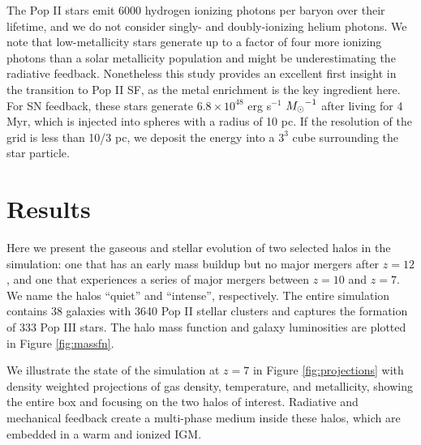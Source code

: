\documentclass[apjl]{emulateapj}
\newcommand{\Ms}{\ifmmode{M_\odot}\else{$M_\odot$}\fi}
\begin{document}
The Pop II stars emit 6000 hydrogen ionizing photons per baryon over
their lifetime, and we do not consider singly- and doubly-ionizing
helium photons.  We note that low-metallicity stars generate up to a
factor of four more ionizing photons than a solar metallicity
population \citep{Schaerer03} and might be underestimating the
radiative feedback.  Nonetheless this study provides an excellent
first insight in the transition to Pop II SF, as the metal enrichment
is the key ingredient here.  For SN feedback, these stars generate
$6.8 \times 10^{48}$ erg s$^{-1}$ $\Ms^{-1}$ after living for 4 Myr,
which is injected into spheres with a radius of 10 pc.  If the
resolution of the grid is less than 10/3 pc, we deposit the energy
into a $3^3$ cube surrounding the star particle.

\begin{figure*}
\caption{\label{fig:evo} (a) Evolution of the total halo mass (top),
  stellar mass (middle), and gas fraction (bottom) of the quiet
  (dashed) and intense (solid) halos.  (b) Mass-weighted stellar
  metallicities and gas metallicities enriched by Pop II and Pop III
  SNe of the intense (top) and quiet (bottom) halos.}
\end{figure*}

\section{Results}
\label{sec:results}

Here we present the gaseous and stellar evolution of two selected
halos in the simulation: one that has an early mass buildup but no
major mergers after $z=12$, and one that experiences a series of major
mergers between $z=10$ and $z=7$.  We name the halos ``quiet'' and
``intense'', respectively.  The entire simulation contains 38 galaxies
with 3640 Pop II stellar clusters and captures the formation of 333
Pop III stars.  The halo mass function and galaxy luminosities are
plotted in Figure \ref{fig:massfn}.


We illustrate the state of the simulation at $z=7$ in Figure
\ref{fig:projections} with density weighted projections of gas
density, temperature, and metallicity, showing the entire box and
focusing on the two halos of interest.  Radiative and mechanical
feedback create a multi-phase medium inside these halos, which are
embedded in a warm and ionized IGM.
\end{document}
